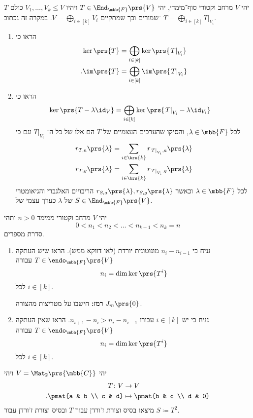 \documentclass[a4paper,10pt,twoside,openany]{article}
\begin{document}
\begin{exercise}
יהי
$V$
מרחב וקטורי סוף־מימדי, יהי
$T \in \End_{\mbb{F}}\prs{V}$
ויהיו
$V_1, \ldots, V_k \leq V$
כולם
$T$%
־שמורים וכך שמתקיים
$V = \bigoplus_{i \in [k]} V_i$.
במקרה זה נכתוב
$T = \bigoplus_{i \in [k]} \left. T \right|_{V_i}$.
\begin{enumerate}
\item 
הראו כי
\begin{align*}
\ker\prs{T} &= \bigoplus_{i \in [k]} \ker\prs{\left. T \right|_{V_i}} \\
\text{.} \im\prs{T} &= \bigoplus_{i \in [k]} \im\prs{\left. T \right|_{V_i}}
\end{align*}

\item
הראו כי
\begin{align*}
\ker\prs{T - \lambda \id_V} &= \bigoplus_{i \in [k]} \ker\prs{\left. T \right|_{V_i} - \lambda \id_{V_i}}
\end{align*}
לכל
$\lambda \in \mbb{F}$,
והסיקו שהערכים העצמיים של
$T$
הם אלו של כל ה־%
$\left. T \right|_{V_i}$
וגם כי
\begin{align*}
r_{T,a}\prs{\lambda} &= \sum_{i \in \brs{k}} r_{\left. T \right|_{V_i}, a}\prs{\lambda} \\
r_{T,g}\prs{\lambda} &= \sum_{i \in \brs{k}} r_{\left. T \right|_{V_i}, g}\prs{\lambda}
\end{align*}
לכל
$\lambda \in \mbb{F}$
וכאשר
$r_{S,a}\prs{\lambda}, r_{S,g}\prs{\lambda}$
הריבויים האלגברי והגיאומטרי של
$\lambda$
כערך עצמי של
$S \in \End_{\mbb{F}}\prs{V}$.
\end{enumerate}
\end{exercise}

\begin{exercise}
יהי
$V$
מרחב וקטורי ממימד
$n > 0$
ותהי
\[0 < n_1 < n_2 < \ldots < n_{k-1} < n_k = n\]
סדרת מספרים.

\begin{enumerate}
\item נניח כי
$n_i - n_{i-1}$
מונוטונית יורדת (לאו דווקא ממש).
הראו שיש העתקה
$T \in \endo_{\mbb{F}}\prs{V}$
עבורה
\[n_i = \dim\ker\prs{T^i}\]
לכל
$i \in [k]$.

\textbf{רמז:}
חישבו על מטריצות מהצורה
$J_m\prs{0}$.

\item נניח כי יש
$i \in [k]$
עבורו
$n_{i+1} - n_i > n_i - n_{i-1}$.
הראו שאין העתקה
$T \in \endo_{\mbb{F}}\prs{V}$
עבורה
\[n_i = \dim\ker\prs{T^i}\]
לכל
$i \in [k]$.
\end{enumerate}
\end{exercise}

\begin{exercise}
יהי
$V = \Mat_{2}\prs{\mbb{C}}$
ויהי
\begin{align*}
T \colon V &\to V \\
\text{.} \pmat{a & b \\ c & d} &\mapsto \pmat{b & c \\ d & 0}
\end{align*}
מיצאו בסיס וצורת ז'ורדן עבור
$T$
ובסיס וצורת ז'ורדן עבור
$S \coloneqq T^2$.
\end{exercise}
\end{document}
